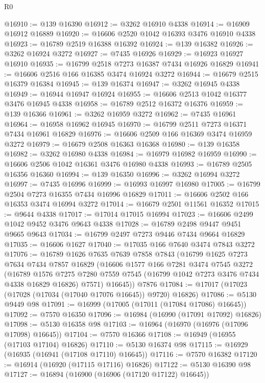 \begin{lexlean}{R0}
\begin{coremodule}
@16910 := @139 @16390
@16912 := @3262 @16910 @4338
@16914 := @16909 @16912 @16889
@16920 := @16606 @2520 @1042 @16393 @3476 @16910 @4338
@16923 := @16789 @2519 @16388 @16392
@16924 := @139 @16382
@16926 := @3262 @16924 @3272
@16927 := @7435 @16926
@16929 := @16923 @16927 @16910
@16935 := @16799 @2518 @7273 @16387 @7434 @16926 @16829
@16941 := @16606 @2516 @166 @16385 @3474 @16924 @3272
@16944 := @16679 @2515 @16379 @16384
@16945 := @139 @16374
@16947 := @3262 @16945 @4338
@16949 := @16944 @16947 @16924
@16955 := @16606 @2513 @1042 @16377 @3476 @16945 @4338
@16958 := @16789 @2512 @16372 @16376
@16959 := @139 @16366
@16961 := @3262 @16959 @3272
@16962 := @7435 @16961
@16964 := @16958 @16962 @16945
@16970 := @16799 @2511 @7273 @16371 @7434 @16961 @16829
@16976 := @16606 @2509 @166 @16369 @3474 @16959 @3272
@16979 := @16679 @2508 @16363 @16368
@16980 := @139 @16358
@16982 := @3262 @16980 @4338
@16984 := @16979 @16982 @16959
@16990 := @16606 @2506 @1042 @16361 @3476 @16980 @4338
@16993 := @16789 @2505 @16356 @16360
@16994 := @139 @16350
@16996 := @3262 @16994 @3272
@16997 := @7435 @16996
@16999 := @16993 @16997 @16980
@17005 := @16799 @2504 @7273 @16355 @7434 @16996 @16829
@17011 := @16606 @2502 @166 @16353 @3474 @16994 @3272
@17014 := @16679 @2501 @11561 @16352
@17015 := @9644 @4338
@17017 := @17014 @17015 @16994
@17023 := @16606 @2499 @1042 @9452 @3476 @9643 @4338
@17028 := @16789 @2498 @9447 @9451 @9665 @9643
@17034 := @16799 @2497 @7273 @9446 @7434 @9664 @16829
@17035 := @16606 @1627
@17040 := @17035 @166 @7640 @3474 @7843 @3272
@17076 := @16789
    @1626
    @7635
    @7639
    @7858
    @7843
    (@16799
      @1625
      @7273
      @7634
      @7434
      @7857
      @16829
      (@16606
        @1577
        @166
        @7281
        @3474
        @7545
        @3272
        (@16789
          @1576
          @7275
          @7280
          @7559
          @7545
          (@16799 @1042 @7273 @3476 @7434 @4338 @16829 @16826)
          @7571)
        @16645))
    @7876
@17084 := @17017 (@17023 (@17028 (@17034 (@17040 @17076 @16645)) @9720) @16826)
@17086 := @5130 @9449 @98
@17091 := @16999 (@17005 (@17011 (@17084 @17086) @16645))
@17092 := @7570 @16350
@17096 := @16984 (@16990 (@17091 @17092) @16826)
@17098 := @5130 @16358 @98
@17103 := @16964 (@16970 (@16976 (@17096 @17098) @16645))
@17104 := @7570 @16366
@17108 := @16949 (@16955 (@17103 @17104) @16826)
@17110 := @5130 @16374 @98
@17115 := @16929 (@16935 (@16941 (@17108 @17110) @16645))
@17116 := @7570 @16382
@17120 := @16914 (@16920 (@17115 @17116) @16826)
@17122 := @5130 @16390 @98
@17127 := @16894 (@16900 (@16906 (@17120 @17122) @16645))

\end{coremodule}
\end{lexlean}
